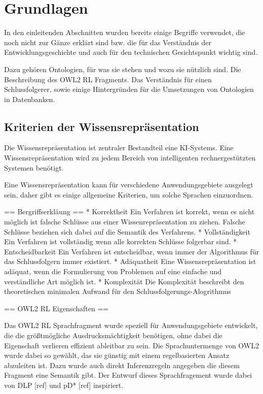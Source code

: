 \chapter{Grundlagen}
In den einleitenden Abschnitten wurden bereits einige Begriffe verwendet, die noch nicht zur Gänze erklärt sind bzw. die für das Verständnis der Entwicklungsgeschichte und auch für den technischen Gesichtspunkt wichtig sind.

Dazu gehören Ontologien, für was sie stehen und wozu sie nützlich sind. Die Beschreibung des OWL2 RL Fragments. Das Verständnis für einen Schlussfolgerer, sowie einige Hintergründen für die Umsetzungen von Ontologien in Datenbanken.

\section{Kriterien der Wissensrepräsentation}

Die Wissensrepräsentation ist zentraler Bestandteil eine KI-Systems. Eine Wissensrepräsentation wird zu jedem Bereich von intelligenten rechnergestützten Systemen benötigt.

Eine Wissensrepräsentation kann für verschiedene Anwendungsgebiete ausgelegt sein, daher gibt es einige allgemeine Kriterien, um solche Sprachen einzuordnen.

== Bergriffserkläung ==
 * Korrektheit
Ein Verfahren ist korrekt, wenn es nicht möglich ist falsche Schlüsse aus einer Wissenrepräsentation zu ziehen. Falsche Schlüsse beziehen sich dabei auf die Semantik des Verfahrens.
 * Vollständigkeit
Ein Verfahren ist vollständig wenn alle korrekten Schlüsse folgerbar sind.
 * Entscheidbarkeit
Ein Verfahren ist entscheidbar, wenn immer der Algorithmus für das Schlussfolgern immer existiert.
 * Adäquatheit
Eine Wissensrepräsentation ist adäquat, wenn die Formulierung von Problemen auf eine einfache und verständliche Art möglich ist.
 * Komplexität
Die Komplexität beschreibt den theoretischen minimalen Aufwand für den Schlussfolgerungs-Alogrithmus

== OWL2 RL Eigenschaften ==

Das OWL2 RL Sprachfragment wurde speziell für Anwendungsgebiete entwickelt, die die größtmögliche Ausdrucksmächtigkeit benötigen, ohne dabei die Eigenschaft verlieren effizient ableitbar zu sein. Die Sprachuntermenge von OWL2 wurde dabei so gewählt, das sie günstig mit einem regelbasierten Ansatz abzuleiten ist. Dazu wurde auch direkt Inferenzregeln angegeben die diesem Fragment eine Semantik gibt. Der Entwurf dieses Sprachfragement wurde dabei von DLP [ref] und pD* [ref] inspiriert.

